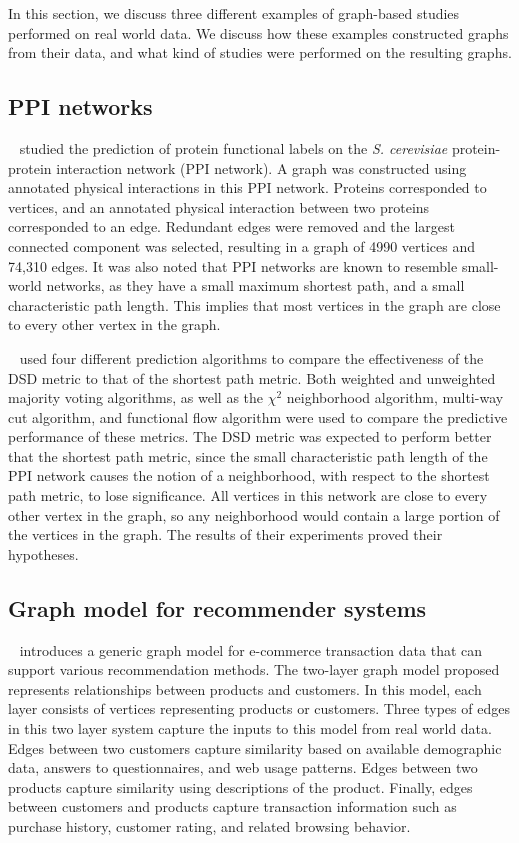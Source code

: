 In this section, we discuss three different examples of graph-based studies performed on real world data. We discuss how these examples constructed graphs from their data, and what kind of studies were performed on the resulting graphs.

\subsection{PPI networks}
~\cite{10.1371/journal.pone.0076339} studied the prediction of protein functional labels on the \emph{S. cerevisiae} protein-protein interaction network (PPI network). A graph was constructed using annotated physical interactions in this PPI network. Proteins corresponded to vertices, and an annotated physical interaction between two proteins corresponded to an edge. Redundant edges were removed and the largest connected component was selected, resulting in a graph of 4990 vertices and 74,310 edges. It was also noted that PPI networks are known to resemble small-world networks, as they have a small maximum shortest path, and a small characteristic path length. This implies that most vertices in the graph are close to every other vertex in the graph.

~\cite{10.1371/journal.pone.0076339} used four different prediction algorithms to compare the effectiveness of the DSD metric to that of the shortest path metric. Both weighted and unweighted majority voting algorithms, as well as the $\chi^{2}$ neighborhood algorithm, multi-way cut algorithm, and functional flow algorithm were used to compare the predictive performance of these metrics. The DSD metric was expected to perform better that the shortest path metric, since the small characteristic path length of the PPI network causes the notion of a neighborhood, with respect to the shortest path metric, to lose significance. All vertices in this network are close to every other vertex in the graph, so any neighborhood would contain a large portion of the vertices in the graph. The results of their experiments proved their hypotheses.


\subsection{Graph model for recommender systems}
~\cite{huang2004graph} introduces a generic graph model for e-commerce transaction data that can support various recommendation methods. The two-layer graph model proposed represents relationships between products and customers. In this model, each layer consists of vertices representing products or customers. Three types of edges in this two layer system capture the inputs to this model from real world data. Edges between two customers capture similarity based on available demographic data, answers to questionnaires, and web usage patterns. Edges between two products capture similarity using descriptions of the product. Finally, edges between customers and products capture transaction information such as purchase history, customer rating, and related browsing behavior.

